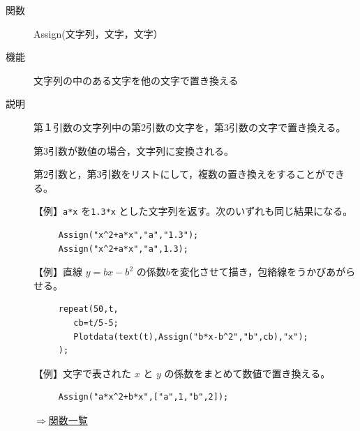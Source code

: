 \documentclass[papersize,a4paper,12pt,uplatex]{jsarticle}
\begin{document}
\begin{description}


\hypertarget{assign}{}
\item[関数]  Assign(文字列，文字，文字）
\item[機能]  文字列の中のある文字を他の文字で置き換える
\item[説明]  第１引数の文字列中の第2引数の文字を，第3引数の文字で置き換える。

第3引数が数値の場合，文字列に変換される。

第2引数と，第3引数をリストにして，複数の置き換えをすることができる。

\vspace{\baselineskip}
  【例】\verb|a*x| を\verb|1.3*x| とした文字列を返す。次のいずれも同じ結果になる。
\begin{verbatim}
     Assign("x^2+a*x","a","1.3"); 
     Assign("x^2+a*x","a",1.3);
\end{verbatim}

\vspace{\baselineskip}
  【例】直線 $y=bx-b^2$ の係数$b$を変化させて描き，包絡線をうかびあがらせる。
\begin{verbatim}
     repeat(50,t,
        cb=t/5-5;
        Plotdata(text(t),Assign("b*x-b^2","b",cb),"x");
     );
\end{verbatim}
\begin{center}  \end{center}
\vspace{\baselineskip}
  【例】文字で表された $x$ と $y$ の係数をまとめて数値で置き換える。
\begin{verbatim} 
     Assign("a*x^2+b*x",["a",1,"b",2]);
\end{verbatim}

\begin{flushright}  \hyperlink{functionlist}{$\Rightarrow$関数一覧}\end{flushright}



\end{description}
\end{document}
